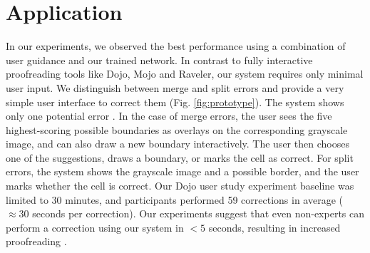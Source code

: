 \section{Application}

In our experiments, we observed the best performance using a combination of user guidance and our trained network. In contrast to fully interactive proofreading tools like Dojo, Mojo\change{,} and Raveler, our system requires only minimal user input. We distinguish between merge and split errors and provide a very simple user interface to correct them (Fig. \ref{fig:prototype}).
The system shows only one potential error . In the case of merge errors, the user sees the five highest-scoring possible boundaries as overlays on the corresponding grayscale image, and can also draw a new boundary interactively. The user then chooses one of the suggestions, draws a boundary, or marks the cell as correct. For split errors, the system shows the grayscale image and a possible border, and the user marks whether the cell is correct. Our Dojo user study experiment baseline was limited to 30 minutes, and participants performed 59 corrections in average ($\approx30$ seconds per correction). Our experiments suggest that even non-experts can perform a correction using our system in $<5$ seconds, resulting in increased proofreading .